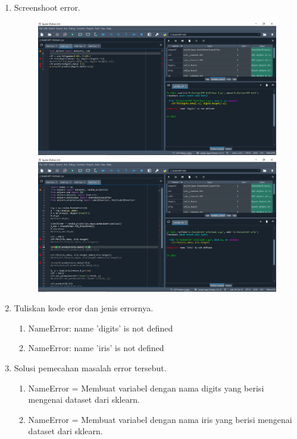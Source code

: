 \begin{enumerate}
	\item
	Screenshoot error.
	\begin{figure}[!htbp]
		\centering
		\includegraphics[scale=0.3]{figures/e.1.PNG}
		\includegraphics[scale=0.3]{figures/e.2.PNG}
	\end{figure}
	\item
	Tuliskan kode eror dan jenis errornya.
	\begin{enumerate}
		\item NameError: name 'digits' is not defined
		\item NameError: name 'iris' is not defined
	\end{enumerate}
	\item
	Solusi pemecahan masalah error tersebut.
	\begin{enumerate}
		\item NameError = Membuat variabel dengan nama digits yang berisi mengenai dataset dari sklearn.
		\item NameError = Membuat variabel dengan nama iris yang berisi mengenai dataset dari sklearn.
	\end{enumerate}

\end{enumerate}

